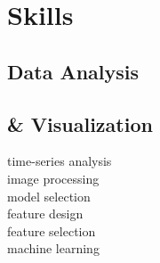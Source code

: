 \documentclass[]{winter-resume-openfont}
\begin{document}
\begin{minipage}[t]{0.29\textwidth} 









\section{Skills}
\sectionsep
\subsection{Data Analysis}
\subsection{\& Visualization}
\sectionsep
{}
\textbullet{} time-series analysis  \\ 
\textbullet{} image processing \\  
\textbullet{} model selection \\  
\textbullet{} feature design \\
\textbullet{} feature selection \\ 
\textbullet{} machine learning  \\ 
\sectionsep


\end{minipage}
\end{document}
